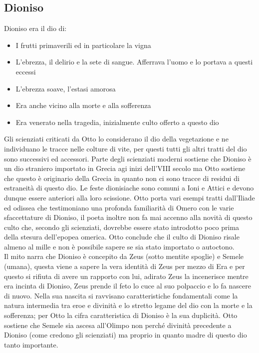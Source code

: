 \documentclass[10pt,a4paper]{article}
\begin{document}
\subsection{Dioniso}
Dioniso era il dio di:
\begin{itemize}
	\item I frutti primaverili ed in particolare la vigna
	\item L'ebrezza, il delirio e la sete di sangue. Afferrava l'uomo e lo portava a questi eccessi
	\item L'ebrezza soave, l'estasi amorosa
	\item Era anche vicino alla morte e alla sofferenza
	\item Era venerato nella tragedia, inizialmente culto offerto a questo dio
\end{itemize}
Gli scienziati criticati da Otto lo considerano il dio della vegetazione e ne individuano le tracce nelle colture di vite, per questi tutti gli altri tratti del dio sono successivi ed accessori.   Parte degli scienziati moderni sostiene che Dioniso è un dio straniero importato in Grecia agi inizi dell'VIII secolo ma Otto sostiene che questo è originario della Grecia in quanto non ci sono tracce di residui di estraneità di questo dio. Le feste dionisiache sono comuni a Ioni e Attici e devono dunque essere anteriori alla loro scissione. Otto porta vari esempi tratti dall'Iliade ed odissea che testimoniano una profonda familiarità di Omero con le varie sfaccettature di Dioniso, il poeta inoltre non fa mai accenno alla novità di questo culto che, secondo gli scienziati, dovrebbe essere stato introdotto poco prima della stesura dell'epopea omerica. Otto conclude che il culto di Dioniso risale almeno al mille e non è possibile sapere se sia stato importato o autoctono.\\
Il mito narra che Dioniso è concepito da Zeus (sotto mentite spoglie) e Semele (umana), questa viene a sapere la vera identità di Zeus per mezzo di Era e per questo si rifiuta di avere un rapporto con lui, adirato Zeus la incenerisce mentre era incinta di Dioniso, Zeus prende il feto lo cuce al suo polpaccio e lo fa nascere di nuovo. Nella sua nascita si ravvisano caratteristiche fondamentali come la natura intermedia tra eroe e divinità e lo stretto legame del dio con la morte e la sofferenza; per Otto la cifra caratteristica di Dioniso è la sua duplicità. Otto sostiene che Semele sia ascesa all'Olimpo non perché divinità precedente a Dioniso (come credono gli scienziati) ma proprio in quanto madre di questo dio tanto importante.
\newpage
\end{document}
